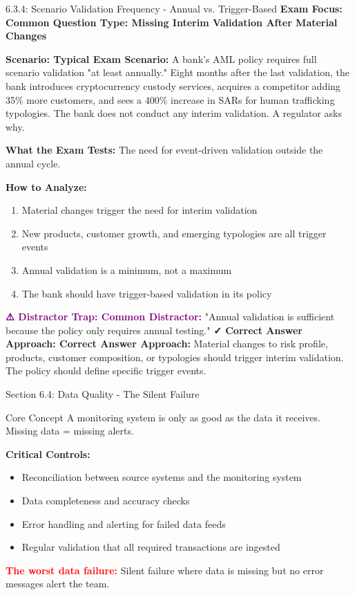 \documentclass[11pt,a4paper]{beamer}
\newcommand{\redflag}[1]{\textcolor{red}{\textbf{#1}}}
\newcommand{\examfocus}[1]{\textcolor{orange!80!black}{\textbf{Exam Focus: #1}}}
\newcommand{\trap}[1]{\textcolor{purple}{\textbf{⚠️ Distractor Trap: #1}}}
\newcommand{\correct}[1]{\textcolor{green!50!black}{\textbf{✓ Correct Answer Approach: #1}}}
\newcommand{\scenario}[1]{\textcolor{blue!70!black}{\textbf{Scenario: #1}}}
\begin{document}
	\begin{frame}{6.3.4: Scenario Validation Frequency - Annual vs. Trigger-Based}
		\examfocus{Common Question Type: Missing Interim Validation After Material Changes}
		
		\scenario{Typical Exam Scenario:}
		A bank's AML policy requires full scenario validation "at least annually." Eight months after the last validation, the bank introduces cryptocurrency custody services, acquires a competitor adding 35\% more customers, and sees a 400\% increase in SARs for human trafficking typologies. The bank does not conduct any interim validation. A regulator asks why.
		
		\textbf{What the Exam Tests:} The need for event-driven validation outside the annual cycle.
		
		\textbf{How to Analyze:}
		\begin{enumerate}
			\item Material changes trigger the need for interim validation
			\item New products, customer growth, and emerging typologies are all trigger events
			\item Annual validation is a minimum, not a maximum
			\item The bank should have trigger-based validation in its policy
		\end{enumerate}
		
		\trap{Common Distractor:} "Annual validation is sufficient because the policy only requires annual testing."
		\correct{Correct Answer Approach:} Material changes to risk profile, products, customer composition, or typologies should trigger interim validation. The policy should define specific trigger events.
	\end{frame}
	
	
	\begin{frame}{Section 6.4: Data Quality - The Silent Failure}
		\begin{block}{Core Concept}
			A monitoring system is only as good as the data it receives. Missing data = missing alerts.
		\end{block}
		\textbf{Critical Controls:}
		\begin{itemize}
			\item Reconciliation between source systems and the monitoring system
			\item Data completeness and accuracy checks
			\item Error handling and alerting for failed data feeds
			\item Regular validation that all required transactions are ingested
		\end{itemize}
		\redflag{The worst data failure:} Silent failure where data is missing but no error messages alert the team.
	\end{frame}
	
\end{document}
